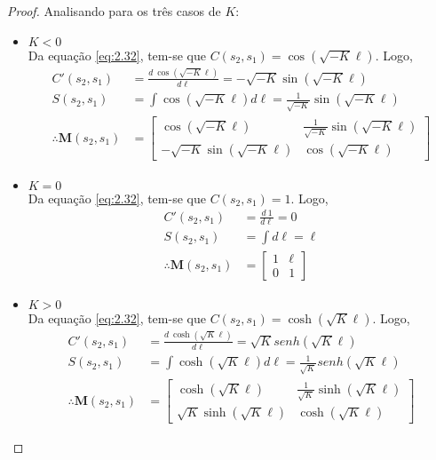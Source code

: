\begin{proof}Analisando para os três casos de $K$:
	\begin{itemize}
	\item $K<0$\\
	
	Da equação \eqref{eq:2.32}, tem-se que $C(s_2,s_1) = \cos(\sqrt{-K}\ell)$. Logo,
	\begin{align*}
        C'(s_2,s_1) &= \frac{d\ \cos(\sqrt{-K}\ell)}{d\ell} = -\sqrt{-K}\sin(\sqrt{-K}\ell)\\
        S(s_2,s_1) &= \int \cos(\sqrt{-K}\ell)d\ell = \frac{1}{\sqrt{-K}}\sin(\sqrt{-K}\ell)\\
        \therefore \boldsymbol{M}(s_2,s_1) &= \begin{bmatrix}
            \cos(\sqrt{-K}\ell) & \frac{1}{\sqrt{-K}}\sin(\sqrt{-K}\ell)\\
            -\sqrt{-K}\sin(\sqrt{-K}\ell) & \cos(\sqrt{-K}\ell)
            \end{bmatrix}
	\end{align*}
	\item $K=0$\\
	
	Da equação \eqref{eq:2.32}, tem-se que $C(s_2,s_1) = 1$. Logo,
	\begin{align*}
		C'(s_2,s_1) &= \frac{d \ 1}{d\ell} = 0\\
		S(s_2,s_1) &= \int d\ell = \ell\\
		\therefore \boldsymbol{M}(s_2,s_1) &= \begin{bmatrix}
				1 & \ell\\
				0 & 1
				\end{bmatrix}
	\end{align*}
	\item $K>0$\\
	
	Da equação \eqref{eq:2.32}, tem-se que $C(s_2,s_1) = \cosh(\sqrt{K}\ell)$. Logo,
		\begin{align*}
        	C'(s_2,s_1) &= \frac{d\ \cosh(\sqrt{K}\ell)}{d\ell} = \sqrt{K}senh(\sqrt{K}\ell)\\
            S(s_2,s_1) &= \int \cosh(\sqrt{K}\ell)d\ell = \frac{1}{\sqrt{K}}senh(\sqrt{K}\ell)\\
            \therefore \boldsymbol{M}(s_2,s_1) &= \begin{bmatrix}
            \cosh(\sqrt{K}\ell) & \frac{1}{\sqrt{K}}\sinh(\sqrt{K}\ell)\\
            \sqrt{K}\sinh(\sqrt{K}\ell) & \cosh(\sqrt{K}\ell)
            \end{bmatrix}
		\end{align*}
	\end{itemize}
\end{proof}
	
